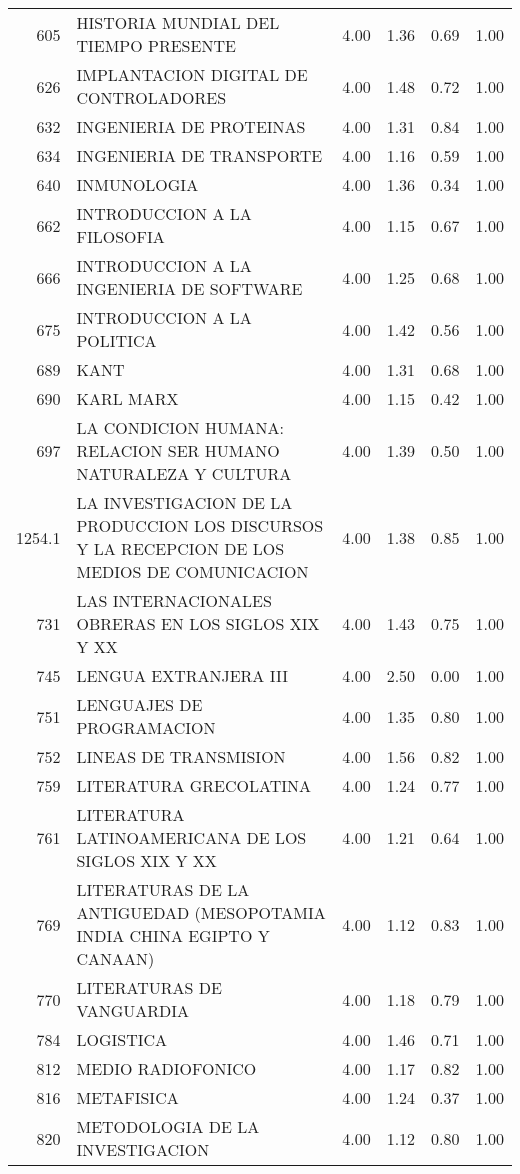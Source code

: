 \documentclass[12pt]{article}
\begin{document}
\begin{table}[ht]
\begin{tabular}{rlrrrr}
  605 & HISTORIA MUNDIAL DEL TIEMPO PRESENTE & 4.00 & 1.36 & 0.69 & 1.00 \\ 
  626 & IMPLANTACION DIGITAL DE CONTROLADORES & 4.00 & 1.48 & 0.72 & 1.00 \\ 
  632 & INGENIERIA DE PROTEINAS & 4.00 & 1.31 & 0.84 & 1.00 \\ 
  634 & INGENIERIA DE TRANSPORTE & 4.00 & 1.16 & 0.59 & 1.00 \\ 
  640 & INMUNOLOGIA & 4.00 & 1.36 & 0.34 & 1.00 \\ 
  662 & INTRODUCCION A LA FILOSOFIA & 4.00 & 1.15 & 0.67 & 1.00 \\ 
  666 & INTRODUCCION A LA INGENIERIA DE SOFTWARE & 4.00 & 1.25 & 0.68 & 1.00 \\ 
  675 & INTRODUCCION A LA POLITICA & 4.00 & 1.42 & 0.56 & 1.00 \\ 
  689 & KANT & 4.00 & 1.31 & 0.68 & 1.00 \\ 
  690 & KARL MARX & 4.00 & 1.15 & 0.42 & 1.00 \\ 
  697 & LA CONDICION HUMANA: RELACION SER HUMANO NATURALEZA Y CULTURA & 4.00 & 1.39 & 0.50 & 1.00 \\ 
  1254.1 & LA INVESTIGACION DE LA PRODUCCION LOS DISCURSOS Y LA RECEPCION DE LOS MEDIOS DE COMUNICACION & 4.00 & 1.38 & 0.85 & 1.00 \\ 
  731 & LAS INTERNACIONALES OBRERAS EN LOS SIGLOS XIX Y XX & 4.00 & 1.43 & 0.75 & 1.00 \\ 
  745 & LENGUA EXTRANJERA III & 4.00 & 2.50 & 0.00 & 1.00 \\ 
  751 & LENGUAJES DE PROGRAMACION & 4.00 & 1.35 & 0.80 & 1.00 \\ 
  752 & LINEAS DE TRANSMISION & 4.00 & 1.56 & 0.82 & 1.00 \\ 
  759 & LITERATURA GRECOLATINA & 4.00 & 1.24 & 0.77 & 1.00 \\ 
  761 & LITERATURA LATINOAMERICANA DE LOS SIGLOS XIX Y XX & 4.00 & 1.21 & 0.64 & 1.00 \\ 
  769 & LITERATURAS DE LA ANTIGUEDAD (MESOPOTAMIA INDIA CHINA EGIPTO Y CANAAN) & 4.00 & 1.12 & 0.83 & 1.00 \\ 
  770 & LITERATURAS DE VANGUARDIA & 4.00 & 1.18 & 0.79 & 1.00 \\ 
  784 & LOGISTICA & 4.00 & 1.46 & 0.71 & 1.00 \\ 
  812 & MEDIO RADIOFONICO & 4.00 & 1.17 & 0.82 & 1.00 \\ 
  816 & METAFISICA & 4.00 & 1.24 & 0.37 & 1.00 \\ 
  820 & METODOLOGIA DE LA INVESTIGACION & 4.00 & 1.12 & 0.80 & 1.00 \\ 

\end{tabular}
\end{table}
\end{document}
